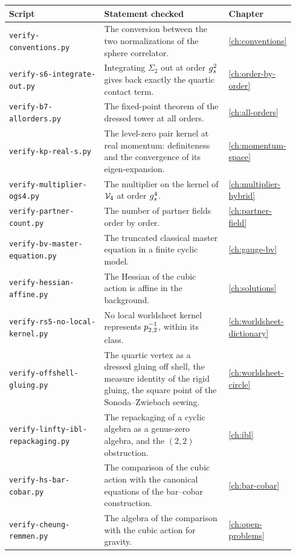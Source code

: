 \begin{center}
  \footnotesize
  \begin{tabular}{@{}>{\raggedright\arraybackslash}p{0.36\linewidth}>{\raggedright\arraybackslash}p{0.5\linewidth}>{\raggedright\arraybackslash}p{0.08\linewidth}@{}}
    \toprule
    Script & Statement checked & Chapter \\
    \midrule
    \nolinkurl{verify-conventions.py} & The conversion between the two normalizations of the sphere correlator. & \ref{ch:conventions} \\
    \nolinkurl{verify-s6-integrate-out.py} & Integrating $\Sigma_2$ out at order $g_s^2$ gives back exactly the quartic contact term. & \ref{ch:order-by-order} \\
    \nolinkurl{verify-b7-allorders.py} & The fixed-point theorem of the dressed tower at all orders. & \ref{ch:all-orders} \\
    \nolinkurl{verify-kp-real-s.py} & The level-zero pair kernel at real momentum: definiteness and the convergence of its eigen-expansion. & \ref{ch:momentum-space} \\
    \nolinkurl{verify-multiplier-ogs4.py} & The multiplier on the kernel of $\mathcal{V}_{4}$ at order $g_s^4$. & \ref{ch:multiplier-hybrid} \\
    \nolinkurl{verify-partner-count.py} & The number of partner fields order by order. & \ref{ch:partner-field} \\
    \nolinkurl{verify-bv-master-equation.py} & The truncated classical master equation in a finite cyclic \Loo{} model. & \ref{ch:gauge-bv} \\
    \nolinkurl{verify-hessian-affine.py} & The Hessian of the cubic action is affine in the background. & \ref{ch:solutions} \\
    \nolinkurl{verify-rs5-no-local-kernel.py} & No local worldsheet kernel represents $p_{2,2}^{-1}$, within its class. & \ref{ch:worldsheet-dictionary} \\
    \nolinkurl{verify-offshell-gluing.py} & The quartic vertex as a dressed gluing off shell, the measure identity of the rigid gluing, the square point of the Sonoda--Zwiebach sewing. & \ref{ch:worldsheet-circle} \\
    \nolinkurl{verify-linfty-ibl-repackaging.py} & The repackaging of a cyclic \Loo{} algebra as a genus-zero \IBL{} algebra, and the $(2, 2)$ obstruction. & \ref{ch:ibl} \\
    \nolinkurl{verify-hs-bar-cobar.py} & The comparison of the cubic action with the canonical equations of the bar--cobar construction. & \ref{ch:bar-cobar} \\
    \nolinkurl{verify-cheung-remmen.py} & The algebra of the comparison with the cubic action for gravity. & \ref{ch:open-problems} \\
    \bottomrule
  \end{tabular}
\end{center}

